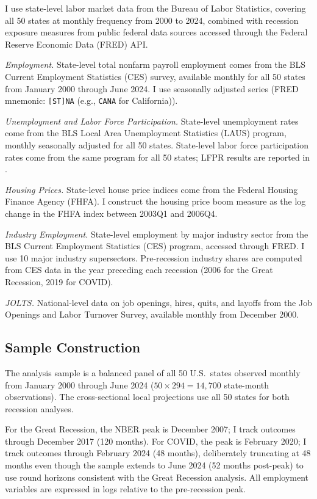\documentclass[12pt]{article}
\begin{document}
I use state-level labor market data from the Bureau of Labor Statistics, covering all 50 states at monthly frequency from 2000 to 2024, combined with recession exposure measures from public federal data sources accessed through the Federal Reserve Economic Data (FRED) API.

\textit{Employment.} State-level total nonfarm payroll employment comes from the BLS Current Employment Statistics (CES) survey, available monthly for all 50 states from January 2000 through June 2024. I use seasonally adjusted series (FRED mnemonic: \texttt{[ST]NA} (e.g., \texttt{CANA} for California)).

\textit{Unemployment and Labor Force Participation.} State-level unemployment rates come from the BLS Local Area Unemployment Statistics (LAUS) program, monthly seasonally adjusted for all 50 states. State-level labor force participation rates come from the same program for all 50 states; LFPR results are reported in .

\textit{Housing Prices.} State-level house price indices come from the Federal Housing Finance Agency (FHFA). I construct the housing price boom measure as the log change in the FHFA index between 2003Q1 and 2006Q4.

\textit{Industry Employment.} State-level employment by major industry sector from the BLS Current Employment Statistics (CES) program, accessed through FRED. I use 10 major industry supersectors. Pre-recession industry shares are computed from CES data in the year preceding each recession (2006 for the Great Recession, 2019 for COVID).

\textit{JOLTS.} National-level data on job openings, hires, quits, and layoffs from the Job Openings and Labor Turnover Survey, available monthly from December 2000.

\subsection{Sample Construction}

The analysis sample is a balanced panel of all 50 U.S.\ states observed monthly from January 2000 through June 2024 ($50 \times 294 = 14{,}700$ state-month observations). The cross-sectional local projections use all 50 states for both recession analyses.

For the Great Recession, the NBER peak is December 2007; I track outcomes through December 2017 (120 months). For COVID, the peak is February 2020; I track outcomes through February 2024 (48 months), deliberately truncating at 48 months even though the sample extends to June 2024 (52 months post-peak) to use round horizons consistent with the Great Recession analysis. All employment variables are expressed in logs relative to the pre-recession peak.
\end{document}
